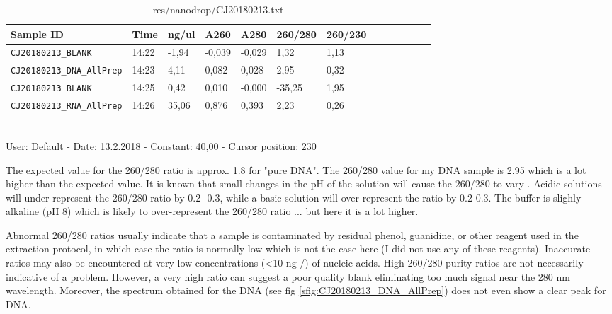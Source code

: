 \begin{table}[htbp]
\caption{res/nanodrop/CJ20180213.txt}
\label{tab:CJ20180213_nanodrop}
\centering
\begin{tabular}{l l l l l l l l l l l l l }
\toprule
Sample ID & Time  & ng/ul  & A260  & A280  & 260/280  & 260/230  \\ \midrule
\texttt{CJ20180213\_BLANK} & 14:22 & -1,94 & -0,039 & -0,029 & 1,32 & 1,13 \\
\texttt{CJ20180213\_DNA\_AllPrep} & 14:23 & 4,11 & 0,082 & 0,028 & 2,95 & 0,32 \\
\texttt{CJ20180213\_BLANK} & 14:25 & 0,42 & 0,010 & -0,000 & -35,25 & 1,95 \\
\texttt{CJ20180213\_RNA\_AllPrep} & 14:26 & 35,06 & 0,876 & 0,393 & 2,23 & 0,26 \\
\bottomrule
\end{tabular}
\\
User: Default - Date: 13.2.2018 - Constant: 40,00 - Cursor position: 230 \
\end{table}


The expected value for the 260/280 ratio is approx. 1.8 for "pure DNA". The 260/280 value for my DNA sample is 2.95 which is a lot higher than the expected value. It is known that small changes in the pH of the solution will cause the 260/280 to vary \citep{mackey1997effect}. Acidic solutions will under-represent the 260/280 ratio by 0.2- 0.3, while a basic solution will over-represent the ratio by 0.2-0.3. The buffer is slighly alkaline (pH 8) which is likely to over-represent the 260/280 ratio ... but here it is a lot higher. 

Abnormal 260/280 ratios usually indicate that a sample is contaminated by residual phenol, guanidine, or other reagent used in the extraction protocol, in which case the ratio is normally low which is not the case here (I did not use any of these reagents). Inaccurate ratios may also be encountered at very low concentrations (<10 ng /\uL) of nucleic acids. High 260/280 purity ratios are not necessarily indicative of a problem. However, a very high ratio can suggest a poor quality blank eliminating too much signal near the 280 nm wavelength. Moreover, the spectrum obtained for the DNA (see fig \ref{sfig:CJ20180213_DNA_AllPrep}) does not even show a clear peak for DNA.


